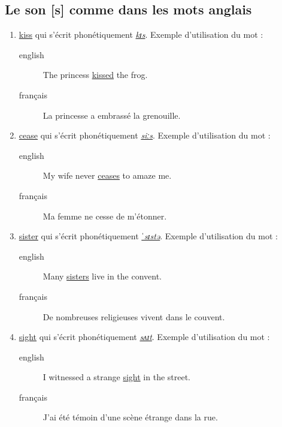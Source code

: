 \documentclass[12pt,a4paper]{book}
\begin{document}
\subsection{Le son [s] comme dans les mots anglais}
\label{sec:org08b2b88}
\begin{enumerate}
\item \href{http://www.wordreference.com/enfr/kiss}{kiss} qui s'écrit phonétiquement \href{https://en.oxforddictionaries.com/definition/kiss}{\emph{kɪs}}. Exemple d'utilisation du mot :
\begin{description}
\item[{english}] \textenglish{The princess \href{https://youtu.be/vMbVzr7WqIo}{kissed} the frog.}
\item[{français}] La princesse a embrassé la grenouille.
\end{description}
\item \href{http://www.wordreference.com/enfr/cease}{cease} qui s'écrit phonétiquement \href{https://en.oxforddictionaries.com/definition/cease}{\emph{siːs}}. Exemple d'utilisation du mot :
\begin{description}
\item[{english}] \textenglish{My wife never \href{https://youtu.be/6m9bEMejTKI}{ceases} to amaze me.}
\item[{français}] Ma femme ne cesse de m'étonner.
\end{description}
\item \href{http://www.wordreference.com/enfr/sister}{sister} qui s'écrit phonétiquement \href{https://en.oxforddictionaries.com/definition/sister}{\emph{ˈsɪstə}}. Exemple d'utilisation du mot :
\begin{description}
\item[{english}] \textenglish{Many \href{https://youtu.be/SBNB13EeRx4}{sisters} live in the convent.}
\item[{français}] De nombreuses religieuses vivent dans le couvent.
\end{description}
\item \href{http://www.wordreference.com/enfr/sight}{sight} qui s'écrit phonétiquement \href{https://en.oxforddictionaries.com/definition/sight}{\emph{sʌɪt}}. Exemple d'utilisation du mot : 
\begin{description}
\item[{english}] \textenglish{I witnessed a strange \href{https://youtu.be/JeiVf30VDDU}{sight} in the street.}
\item[{français}] J'ai été témoin d'une scène étrange dans la rue.
\end{description}
\end{enumerate}
\end{document}
